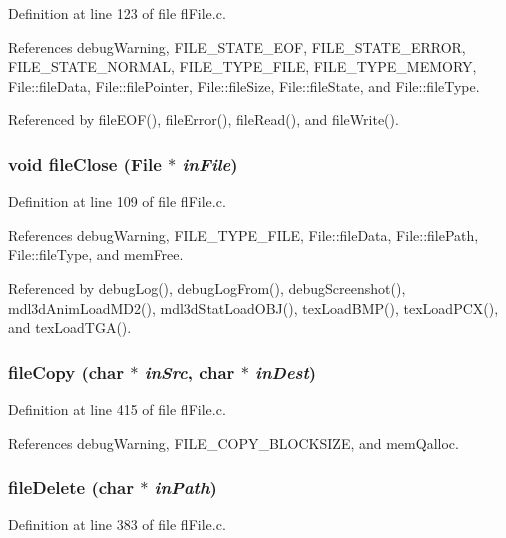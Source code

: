 Definition at line 123 of file fl\-File.c.

References debug\-Warning, FILE\_\-STATE\_\-EOF, FILE\_\-STATE\_\-ERROR, FILE\_\-STATE\_\-NORMAL, FILE\_\-TYPE\_\-FILE, FILE\_\-TYPE\_\-MEMORY, File::file\-Data, File::file\-Pointer, File::file\-Size, File::file\-State, and File::file\-Type.

Referenced by file\-EOF(), file\-Error(), file\-Read(), and file\-Write().
\subsubsection{\setlength{\rightskip}{0pt plus 5cm}void file\-Close ({\bf File} $\ast$ {\em in\-File})}\label{flFile_8h_bdd17f626a43391a546883c7a0544dc3}




Definition at line 109 of file fl\-File.c.

References debug\-Warning, FILE\_\-TYPE\_\-FILE, File::file\-Data, File::file\-Path, File::file\-Type, and mem\-Free.

Referenced by debug\-Log(), debug\-Log\-From(), debug\-Screenshot(), mdl3d\-Anim\-Load\-MD2(), mdl3d\-Stat\-Load\-OBJ(), tex\-Load\-BMP(), tex\-Load\-PCX(), and tex\-Load\-TGA().
\subsubsection{ file\-Copy (char $\ast$ {\em in\-Src}, char $\ast$ {\em in\-Dest})}\label{flFile_8h_05c6b10c65b33fe1e721042c9770105c}




Definition at line 415 of file fl\-File.c.

References debug\-Warning, FILE\_\-COPY\_\-BLOCKSIZE, and mem\-Qalloc.
\subsubsection{ file\-Delete (char $\ast$ {\em in\-Path})}\label{flFile_8h_c1a484538015c2484789df26ddc797b0}




Definition at line 383 of file fl\-File.c.

